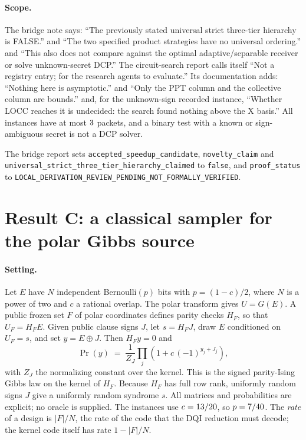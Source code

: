 \documentclass[10pt]{article}
\begin{document}
\paragraph{Scope.} The bridge note says: ``The previously stated universal strict three-tier hierarchy is FALSE.'' and ``The two specified product strategies have no universal ordering.'' and ``This also does not compare against the optimal adaptive/separable receiver or solve unknown-secret DCP.'' The circuit-search report calls itself ``Not a registry entry; for the research agents to evaluate.'' Its documentation adds: ``Nothing here is asymptotic.'' and ``Only the PPT column and the collective column are bounds.'' and, for the unknown-sign recorded instance, ``Whether LOCC reaches it is undecided: the search found nothing above the X basis.'' All instances have at most $3$ packets, and a binary test with a known or sign-ambiguous secret is not a DCP solver.
\begin{flushleft}
The bridge report sets \texttt{accepted\_speedup\_candidate}, \texttt{novelty\_claim} and \texttt{universal\_strict\_three\_tier\_hierarchy\_claimed} to \texttt{false}, and \texttt{proof\_status} to \texttt{LOCAL\_DERIVATION\_REVIEW\_PENDING\_NOT\_FORMALLY\_VERIFIED}.
\end{flushleft}

\section{Result C: a classical sampler for the polar Gibbs source}
\label{sec:polar}

\paragraph{Setting.} Let $E$ have $N$ independent Bernoulli$(p)$ bits with $p=(1-c)/2$, where $N$ is a power of two and $c$ a rational overlap. The polar transform gives $U=G(E)$. A public frozen set $F$ of polar coordinates defines parity checks $H_F$, so that $U_F = H_F E$. Given public clause signs $J$, let $s = H_F J$, draw $E$ conditioned on $U_F = s$, and set $y = E \oplus J$. Then $H_F y = 0$ and
\[
\operatorname{Pr}(y) \;=\; \frac{1}{Z_J} \prod_{j} \left(1 + c\,(-1)^{y_j + J_j}\right),
\]
with $Z_J$ the normalizing constant over the kernel. This is the signed parity-Ising Gibbs law on the kernel of $H_F$. Because $H_F$ has full row rank, uniformly random signs $J$ give a uniformly random syndrome $s$. All matrices and probabilities are explicit; no oracle is supplied. The instances use $c=13/20$, so $p=7/40$. The \emph{rate} of a design is $|F|/N$, the rate of the code that the DQI reduction must decode; the kernel code itself has rate $1-|F|/N$.
\end{document}
